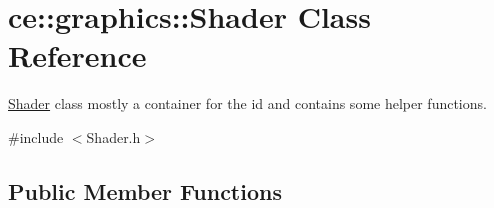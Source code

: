 \hypertarget{classce_1_1graphics_1_1_shader}{}\section{ce\+:\+:graphics\+:\+:Shader Class Reference}
\label{classce_1_1graphics_1_1_shader}


\hyperlink{classce_1_1graphics_1_1_shader}{Shader} class mostly a container for the id and contains some helper functions.  




{\ttfamily \#include $<$Shader.\+h$>$}

\subsection*{Public Member Functions}
